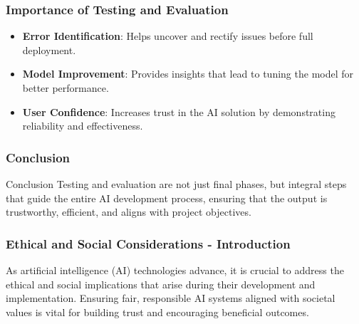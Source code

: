 \documentclass[aspectratio=169]{beamer}
\begin{document}
\begin{frame}[fragile]
    \frametitle{Importance of Testing and Evaluation}
    \begin{itemize}
        \item \textbf{Error Identification}: Helps uncover and rectify issues before full deployment.
        \item \textbf{Model Improvement}: Provides insights that lead to tuning the model for better performance.
        \item \textbf{User Confidence}: Increases trust in the AI solution by demonstrating reliability and effectiveness.
    \end{itemize}
\end{frame}

\begin{frame}[fragile]
    \frametitle{Conclusion}
    \begin{block}{Conclusion}
        Testing and evaluation are not just final phases, but integral steps that guide the entire AI development process, ensuring that the output is trustworthy, efficient, and aligns with project objectives.
    \end{block}
\end{frame}

\begin{frame}[fragile]
    \frametitle{Ethical and Social Considerations - Introduction}
    As artificial intelligence (AI) technologies advance, it is crucial to address the ethical and social implications that arise during their development and implementation. Ensuring fair, responsible AI systems aligned with societal values is vital for building trust and encouraging beneficial outcomes.
\end{frame}
\end{document}
